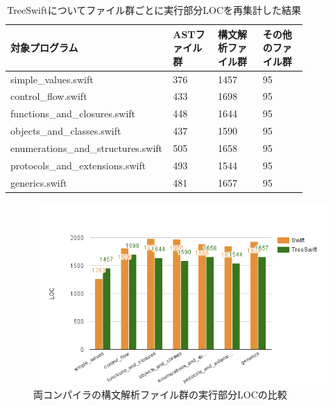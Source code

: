 \begin{table}[!hbtp]
    \begin{center}
        \caption{TreeSwiftについてファイル群ごとに実行部分LOCを再集計した結果}
        \begin{tabular}{|p{0.4\linewidth}|p{0.15\linewidth}|p{0.15\linewidth}|p{0.15\linewidth}|}
            \hline
            対象プログラム & ASTファイル群 & 構文解析ファイル群 & その他のファイル群\\
            \hline
            \hline
            simple\_values.swift & 376 & 1457 & 95\\
            \hline
            control\_flow.swift & 433 & 1698 & 95\\
            \hline
            functions\_and\_closures.swift & 448 & 1644 & 95\\
            \hline
            objects\_and\_classes.swift & 437 & 1590 & 95\\
            \hline
            enumerations\_and\_structures.swift & 505 & 1658 & 95\\
            \hline
            protocols\_and\_extensions.swift & 493 & 1544 & 95\\
            \hline
            generics.swift & 481 & 1657 & 95\\
            \hline
        \end{tabular}
        \label{table:loc-treeswift-per-file}
    \end{center}
\end{table}

\begin{figure}
    \begin{center}
        \includegraphics[scale=0.8]{./img/parse_loc_result.png}
        \caption{両コンパイラの構文解析ファイル群の実行部分LOCの比較}
        \label{img:parse-loc-result}
    \end{center}
\end{figure}

